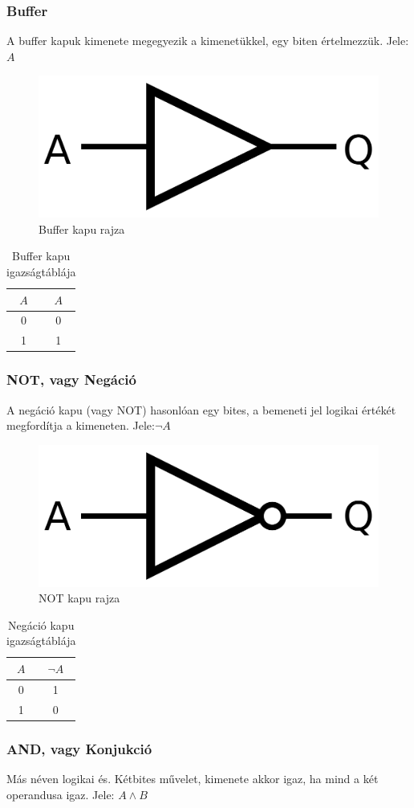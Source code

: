 \documentclass[
]{thesis-ekf}
\theoremstyle{definition}
\theoremstyle{remark}
\begin{document}
\subsubsection{Buffer}
A buffer kapuk kimenete megegyezik a kimenetükkel, egy biten értelmezzük. Jele: $A$

\begin{figure}[H]
	\centering
	\includegraphics[width=0.3\linewidth]{buffer}
	\caption{Buffer kapu rajza}
	\label{fig:buffer}
\end{figure}


\begin{table}[H]
	\centering
	\begin{tabular}{c|c}
		$A$ & $A$\\
		\hline
		0 & 0\\
		1 & 1
	\end{tabular}
	\caption{Buffer kapu igazságtáblája}
\end{table}

\subsubsection{NOT, vagy Negáció}
A negáció kapu (vagy NOT) hasonlóan egy bites, a bemeneti jel logikai értékét megfordítja a kimeneten. Jele:$\neg A$

\begin{figure}[H]
	\centering
	\includegraphics[width=0.3\linewidth]{not}
	\caption{NOT kapu rajza}
	\label{fig:not}
\end{figure}


\begin{table}[H]
	\centering
	\begin{tabular}{c|c}
		$A$ & $\neg A$\\
		\hline
		0 & 1\\
		1 & 0 
	\end{tabular}
	\caption{Negáció kapu igazságtáblája}
\end{table}

\subsubsection{AND, vagy Konjukció}
Más néven logikai és. Kétbites művelet, kimenete akkor igaz, ha mind a két operandusa igaz. Jele: $A \land B$
\end{document}

